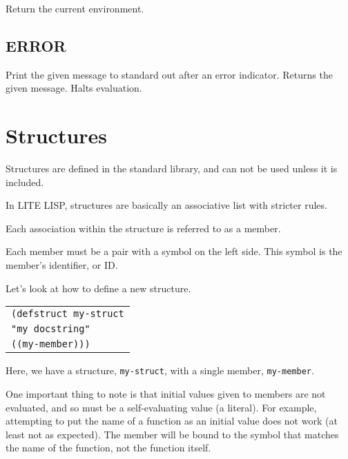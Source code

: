 \documentclass[
letterpaper,
oneside,
]{memoir}
\begin{document}
\noindent
Return the current environment.

\vspace{1em}

\section{ERROR}

\noindent
Print the given message to standard out after an error indicator. Returns the given message. Halts evaluation.

\vspace{1em}

\chapter{Structures}

Structures are defined in the standard library, and can not be used unless it is included.

\vspace{1em}
\noindent
In LITE LISP, structures are basically an associative list with stricter rules.

\vspace{1em}
\noindent
Each association within the structure is referred to as a member.

\vspace{1em}
\noindent
Each member must be a pair with a symbol on the left side. This symbol is the member’s identifier, or ID.

\vspace{1em}
\noindent
Let’s look at how to define a new structure.

\vspace{1em}
\begin{tabular}{l}
  \verb|(defstruct my-struct| \\
  \qquad\verb|"my docstring"| \\
  \qquad\verb|((my-member)))| \\
\end{tabular}
\vspace{1em}

\noindent
Here, we have a structure, \texttt{my-struct}, with a single member, \texttt{my-member}.

\vspace{1em}
\noindent
One important thing to note is that initial values given to members are not evaluated, and so must be a self-evaluating value (a literal). For example, attempting to put the name of a function as an initial value does not work (at least not as expected). The member will be bound to the symbol that matches the name of the function, not the function itself.
\end{document}
